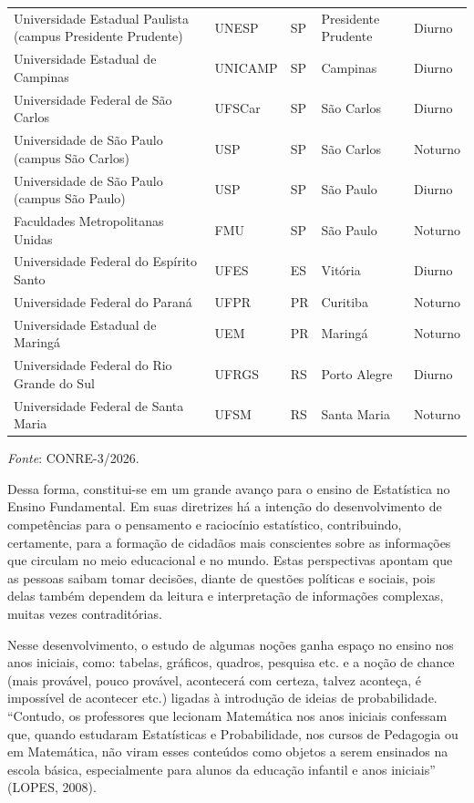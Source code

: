 {\begin{longtable}{p{5.2cm}p{1.2cm}p{0.8cm}p{2.6cm}p{2.6cm}}
Universidade Estadual Paulista (campus Presidente Prudente) & UNESP & SP & Presidente Prudente & Diurno\\
Universidade Estadual de Campinas & UNICAMP & SP & Campinas & Diurno\\
Universidade Federal de S\~ao Carlos & UFSCar & SP & S\~ao Carlos & Diurno\\
Universidade de S\~ao Paulo (campus S\~ao Carlos) & USP & SP & S\~ao Carlos & Noturno\\
Universidade de S\~ao Paulo (campus S\~ao Paulo) & USP & SP & S\~ao Paulo & Diurno\\
Faculdades Metropolitanas Unidas & FMU & SP & S\~ao Paulo & Noturno\\
Universidade Federal do Esp\'irito Santo & UFES & ES & Vit\'oria & Diurno\\
Universidade Federal do Paran\'a & UFPR & PR & Curitiba & Noturno\\
Universidade Estadual de Maring\'a & UEM & PR & Maring\'a & Noturno\\
Universidade Federal do Rio Grande do Sul & UFRGS & RS & Porto Alegre & Diurno\\
Universidade Federal de Santa Maria & UFSM & RS & Santa Maria & Noturno\\
\end{longtable}
{\footnotesize\textit{Fonte}: CONRE-3/2026.}\vskip0.3cm
}

Dessa forma, constitui-se em um grande avanço para o ensino de Estatística no Ensino Fundamental. Em suas diretrizes há a intenção do desenvolvimento de competências para o pensamento e raciocínio estatístico, contribuindo, certamente, para a formação de cidadãos mais conscientes sobre as informações que circulam no meio educacional e no mundo. Estas perspectivas apontam que as pessoas saibam tomar decisões, diante de questões políticas e sociais, pois delas também dependem da leitura e interpretação de informações complexas, muitas vezes contraditórias.\vskip0.3cm


\newpage
Nesse desenvolvimento, o estudo de algumas noções ganha espaço no ensino nos anos iniciais, como: tabelas, gráficos, quadros, pesquisa etc. e a noção de chance (mais provável, pouco provável, acontecerá com certeza, talvez aconteça, é impossível de acontecer etc.) ligadas à introdução de ideias de probabilidade. “Contudo, os professores que lecionam Matemática nos anos iniciais confessam que, quando estudaram Estatísticas e Probabilidade, nos cursos de Pedagogia ou em Matemática, não viram esses conteúdos como objetos a serem ensinados na escola básica, especialmente para alunos da educação infantil e anos iniciais” (LOPES, 2008). \vskip0.3cm

